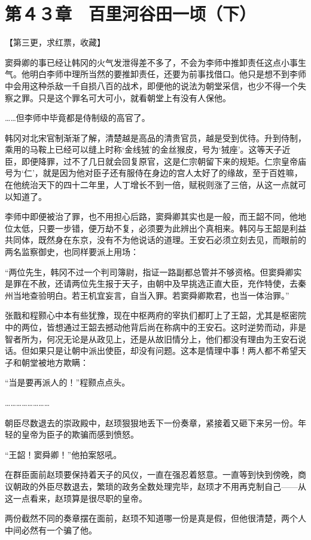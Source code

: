 \section{第４３章　百里河谷田一顷（下）}

【第三更，求红票，收藏】

窦舜卿的事已经让韩冈的火气发泄得差不多了，不会为李师中推卸责任这点小事生气。他明白李师中理所当然的要推卸责任，还要为前事找借口。他只是想不到李师中会用这种杀敌一千自损八百的战术，即便他的说法为朝堂采信，也少不得一个失察之罪。只是这个罪名可大可小，就看朝堂上有没有人保他。

……但李师中毕竟都是侍制级的高官了。

韩冈对北宋官制渐渐了解，清楚越是高品的清贵官员，越是受到优待。升到侍制，乘用的马鞍上已经可以缝上时称‘金线狨’的金丝猴皮，号为‘狨座’。这等天子近臣，即便降罪，过不了几日就会回复原官，这是仁宗朝留下来的规矩。仁宗皇帝庙号为‘仁’，就是因为他对臣子还有服侍在身边的宫人太好了的缘故，至于百姓嘛，在他统治天下的四十二年里，人丁增长不到一倍，赋税则涨了三倍，从这一点就可以知道了。

李师中即便被治了罪，也不用担心后路，窦舜卿其实也是一般，而王韶不同，他地位太低，只要一步错，便万劫不复，必须要为此辨出个真相来。韩冈与王韶是利益共同体，既然身在东京，没有不为他说话的道理。王安石必须立刻去见，而眼前的两名监察御史，也同样要派上用场：

“两位先生，韩冈不过一个判司簿尉，指证一路副都总管并不够资格。但窦舜卿实是罪在不赦，还请两位先生报于天子，由朝中及早挑选正直大臣，充作特使，去秦州当地查验明白。若王机宜妄言，自当入罪。若窦舜卿欺君，也当一体治罪。”

张戬和程颢心中本有些犹豫，现在中枢两府的宰执们都盯上了王韶，尤其是枢密院中的两位，皆想通过王韶去撼动他背后尚在称病中的王安石。这时逆势而动，非是智者所为，何况无论是从政见上，还是从故旧情分上，他们都没有理由为王安石说话。但如果只是让朝中派出使臣，却没有问题。这本是情理中事！两人都不希望天子和朝堂被地方欺瞒：

“当是要再派人的！”程颢点点头。

……………………

朝臣尽数退去的崇政殿中，赵顼狠狠地丢下一份奏章，紧接着又砸下来另一份。年轻的皇帝为臣子的欺骗而感到愤怒。

“王韶！窦舜卿！”他拍案怒吼。

在群臣面前赵顼要保持着天子的风仪，一直在强忍着怒意。一直等到快到傍晚，商议朝政的外臣尽数退去，繁琐的政务全数处理完毕，赵顼才不用再克制自己——从这一点看来，赵顼算是很尽职的皇帝。

两份截然不同的奏章摆在面前，赵顼不知道哪一份是真是假，但他很清楚，两个人中间必然有一个骗了他。

